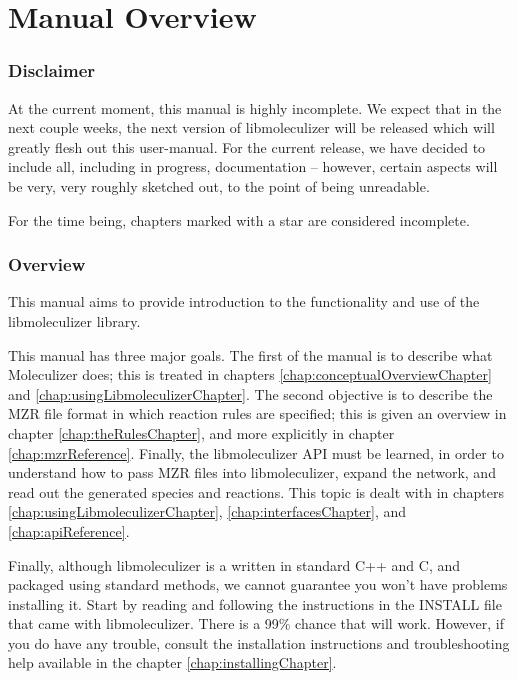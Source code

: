 \section{Manual Overview}

\subsubsection{Disclaimer}
At the current moment, this manual is highly incomplete.  We expect
that in the next couple weeks, the next version of libmoleculizer will
be released which will greatly flesh out this user-manual.  For the
current release, we have decided to include all, including in
progress, documentation -- however, certain aspects will be very, very
roughly sketched out, to the point of being unreadable.  

For the time being, chapters marked with a star are considered
incomplete. 

\subsubsection{Overview}

This manual aims to provide introduction to the functionality and use
of the libmoleculizer library.  

This manual has three major goals.  The first of the manual is to
describe what Moleculizer does; this is treated in chapters
\ref{chap:conceptualOverviewChapter} and
\ref{chap:usingLibmoleculizerChapter}.  The second objective is to
describe the MZR file format in which reaction rules are specified;
this is given an overview in chapter \ref{chap:theRulesChapter}, and
more explicitly in chapter \ref{chap:mzrReference}.  Finally, the
libmoleculizer API must be learned, in order to understand how to pass
MZR files into libmoleculizer, expand the network, and read out
the generated species and reactions.  This topic is dealt with in
chapters \ref{chap:usingLibmoleculizerChapter},
\ref{chap:interfacesChapter}, and \ref{chap:apiReference}.

Finally, although libmoleculizer is a written in standard C++ and C,
and packaged using standard methods, we cannot guarantee you won't
have problems installing it.  Start by reading and following the
instructions in the INSTALL file that came with libmoleculizer.  There
is a 99\% chance that will work.  However, if you do have any trouble,
consult the installation instructions and troubleshooting help
available in the chapter \ref{chap:installingChapter}.

